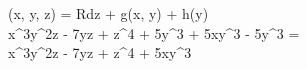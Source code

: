 \phi(x, y, z) = \int Rdz + g(x, y) + h(y) \implies\\
x^3y^2z - 7yz + z^4 + 5y^3 + 5xy^3 - 5y^3 =\\
x^3y^2z - 7yz + z^4 + 5xy^3